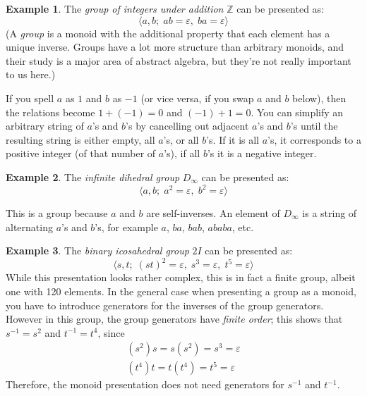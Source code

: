 \documentclass[a4paper,headsepline,bibliography=totoc,toc=flat,fleqn,twoside=semi]{scrbook}
\theoremstyle{definition}
\theoremstyle{definition}
\newtheorem{example}{Example}[chapter]
\theoremstyle{definition}
\begin{document}
\begin{example}
The \emph{group of integers under addition} $\mathbb{Z}$ can be presented as:
\[\langle a, b;\;ab=\varepsilon,\;ba=\varepsilon\rangle\]
(A \emph{group} is a monoid with the additional property that each element has a unique inverse. Groups have a lot more structure than arbitrary monoids, and their study is a major area of abstract algebra, but they're not really important to us here.)

If you spell $a$ as $1$ and $b$ as $-1$ (or vice versa, if you swap $a$ and $b$ below), then the relations become $1+(-1)=0$ and $(-1)+1=0$. You can simplify an arbitrary string of $a$'s and $b$'s by cancelling out adjacent $a$'s and $b$'s until the resulting string is either empty, all $a$'s, or all $b$'s. If it is all $a$'s, it corresponds to a positive integer (of that number of $a$'s), if all $b$'s it is a negative integer.
\end{example}

\begin{example}
The \emph{infinite dihedral group} $D_\infty$ can be presented as:
\[\langle a, b;\; a^2=\varepsilon,\; b^2=\varepsilon\rangle\]

This is a group because $a$ and $b$ are self-inverses. An element of $D_\infty$ is a string of alternating $a$'s and $b$'s, for example $a$, $ba$, $bab$, $ababa$, etc.
\end{example}

\begin{example}
The \emph{binary icosahedral group} $2I$ can be presented as:
\[\langle s, t;\; (st)^2=\varepsilon,\; s^3=\varepsilon,\; t^5=\varepsilon\rangle\]
While this presentation looks rather complex, this is in fact a finite group, albeit one with 120 elements. In the general case when presenting a group as a monoid, you have to introduce generators for the inverses of the group generators. However in this group, the group generators have \emph{finite order}; this shows that $s^{-1}=s^2$ and $t^{-1}=t^4$, since
\begin{align*}
(s^2)s=s(s^2)=s^3=\varepsilon\\
(t^4)t=t(t^4)=t^5=\varepsilon
\end{align*}
Therefore, the monoid presentation does not need generators for $s^{-1}$ and $t^{-1}$.
\end{example}
\end{document}

